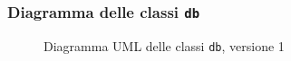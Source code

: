 \subsubsection{Diagramma delle classi \texttt{db}}
\vspace{0.5cm}
\begin{figure}[H]
    \centering
    \caption{Diagramma UML delle classi \texttt{db}, versione 1}
    \label{fig:class_db_v_1}
\end{figure}